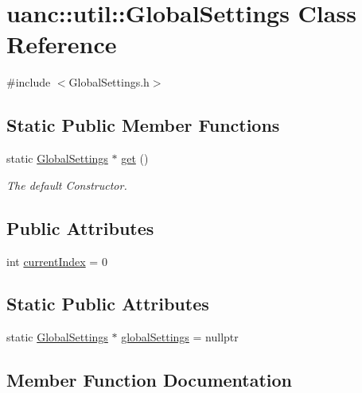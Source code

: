 \hypertarget{classuanc_1_1util_1_1_global_settings}{}\section{uanc\+:\+:util\+:\+:Global\+Settings Class Reference}
\label{classuanc_1_1util_1_1_global_settings}


{\ttfamily \#include $<$Global\+Settings.\+h$>$}

\subsection*{Static Public Member Functions}
\begin{DoxyCompactItemize}
\item 
static \hyperlink{classuanc_1_1util_1_1_global_settings}{Global\+Settings} $\ast$ \hyperlink{classuanc_1_1util_1_1_global_settings_a346f903079cd632e18278d30f03a1fac}{get} ()
\begin{DoxyCompactList}\small\item\em The default Constructor. \end{DoxyCompactList}\end{DoxyCompactItemize}
\subsection*{Public Attributes}
\begin{DoxyCompactItemize}
\item 
int \hyperlink{classuanc_1_1util_1_1_global_settings_aa44f491fb5835682da35431cac26ab28}{current\+Index} = 0
\end{DoxyCompactItemize}
\subsection*{Static Public Attributes}
\begin{DoxyCompactItemize}
\item 
static \hyperlink{classuanc_1_1util_1_1_global_settings}{Global\+Settings} $\ast$ \hyperlink{classuanc_1_1util_1_1_global_settings_a4edfe7df393a7c61477aec88f61419b5}{global\+Settings} = nullptr
\end{DoxyCompactItemize}


\subsection{Member Function Documentation}
